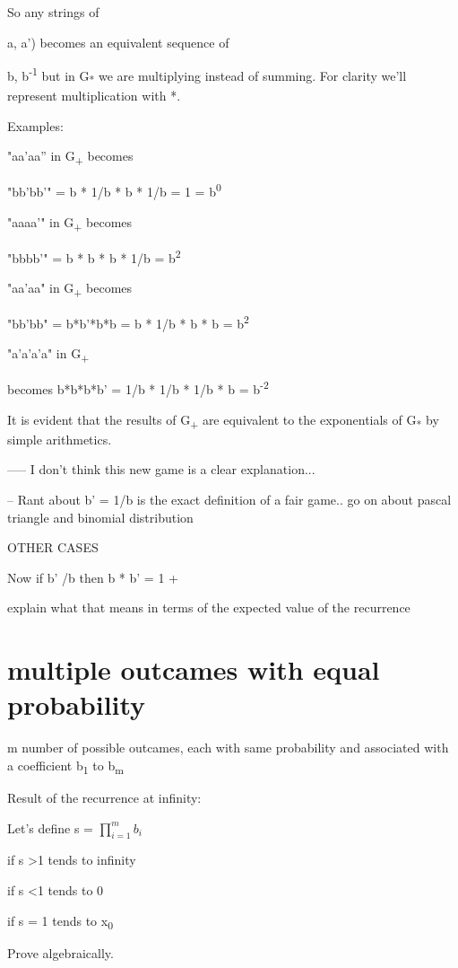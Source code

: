 \documentclass[12pt,reqno]{amsart}
\begin{document}
So any strings of {a, a') becomes an equivalent sequence of {b, b\textsuperscript{-1} but in G\textsubscript{*} we are multiplying instead of summing. For clarity we'll represent multiplication with *.

Examples: 

"aa'aa'' in G\textsubscript{+} becomes

"bb'bb'" = b * 1/b * b * 1/b = 1 = b\textsuperscript{0}

"aaaa'" in G\textsubscript{+} becomes

"bbbb'" = b * b * b * 1/b = b\textsuperscript{2}

"aa'aa" in G\textsubscript{+} becomes

"bb'bb" = b*b'*b*b = b * 1/b * b * b = b\textsuperscript{2}

"a'a'a'a" in G\textsubscript{+}

becomes b*b*b*b' = 1/b * 1/b * 1/b * b = b\textsuperscript{-2}

It is evident that the results of G\textsubscript{+} are equivalent to the 
exponentials of G\textsubscript{*} by simple arithmetics.

----- I don't think this new game is a clear explanation... 

-- Rant about b' = 1/b is the exact definition of a fair game.. go on about pascal triangle and binomial distribution


OTHER CASES

Now if b' /b  then  b * b' = 1 + \epsilon 

explain what that means in terms of the expected value of the recurrence


\section{multiple outcames with equal probability}

m number of possible outcames, each with same probability and associated with a coefficient b\textsubscript{1} to b\textsubscript{m}



Result of the recurrence at infinity:



Let's define s = $\prod_{i=1}^{m} b_{i}$

if s \textgreater 1 tends to infinity

if s \textless 1 tends to 0

if s = 1 tends to x\textsubscript{0}


Prove algebraically.

}}
\end{document}
